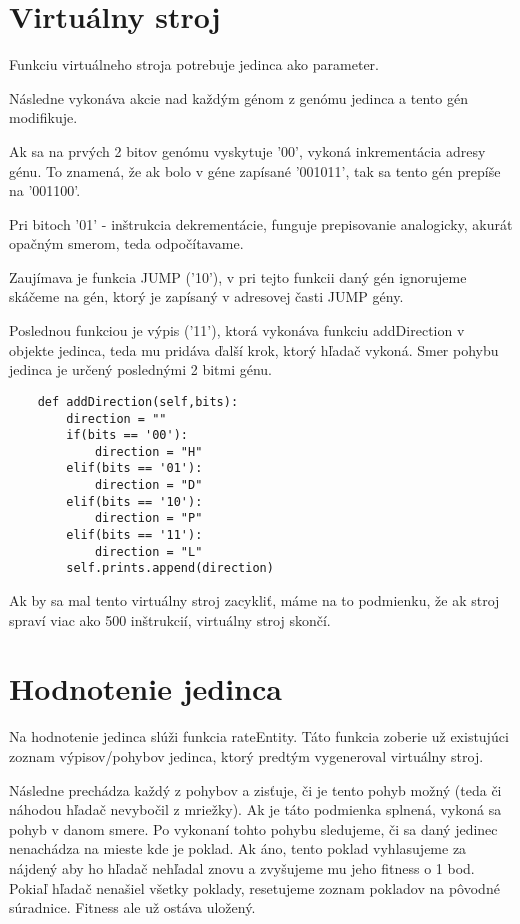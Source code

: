 \documentclass[10pt,oneside,slovak,a4paper]{article}
\begin{document}
\section{Virtuálny stroj}

Funkciu virtuálneho stroja potrebuje jedinca ako parameter.

Následne vykonáva akcie nad každým génom z genómu jedinca a tento gén modifikuje.

Ak sa na prvých 2 bitov genómu vyskytuje '00', vykoná inkrementácia adresy génu.
To znamená, že ak bolo v géne zapísané '001011', tak sa tento gén prepíše na '001100'.

Pri bitoch '01' - inštrukcia dekrementácie, funguje prepisovanie analogicky, akurát opačným smerom, teda odpočítavame.

Zaujímava je funkcia JUMP ('10'), v pri tejto funkcii daný gén ignorujeme skáčeme na gén, ktorý je zapísaný v adresovej časti JUMP gény.

Poslednou funkciou je výpis ('11'), ktorá vykonáva funkciu addDirection v objekte jedinca, teda mu pridáva ďalší krok, ktorý hľadač vykoná.
Smer pohybu jedinca je určený poslednými 2 bitmi génu. 

\begin{lstlisting}
    def addDirection(self,bits):
        direction = ""
        if(bits == '00'):
            direction = "H"
        elif(bits == '01'):
            direction = "D"
        elif(bits == '10'):
            direction = "P"
        elif(bits == '11'):
            direction = "L"
        self.prints.append(direction)
\end{lstlisting} 

Ak by sa mal tento virtuálny stroj zacykliť, máme na to podmienku, že ak stroj spraví viac ako 500 inštrukcií, virtuálny stroj skončí.

\section{Hodnotenie jedinca}

Na hodnotenie jedinca slúži funkcia rateEntity. Táto funkcia zoberie už existujúci zoznam výpisov/pohybov jedinca, ktorý predtým vygeneroval virtuálny stroj.

Následne prechádza každý z pohybov a zisťuje, či je tento pohyb možný (teda či náhodou hľadač nevybočil z mriežky).
Ak je táto podmienka splnená, vykoná sa pohyb v danom smere.
Po vykonaní tohto pohybu sledujeme, či sa daný jedinec nenachádza na mieste kde je poklad. Ak áno, tento poklad vyhlasujeme za nájdený aby ho hľadač nehľadal znovu a zvyšujeme mu jeho fitness o 1 bod. Pokiaľ hľadač nenašiel všetky poklady, resetujeme zoznam pokladov na pôvodné súradnice. Fitness ale už ostáva uložený.
\end{document}
